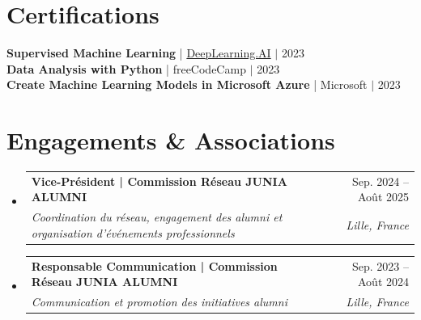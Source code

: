 \documentclass[letterpaper,11pt]{article}
\makeatletter
\newcommand{\resumeSubheading}[4]{
  \vspace{1pt}\item
    \begin{tabular*}{0.97\textwidth}[t]{l@{\extracolsep{\fill}}r}
      {\color{primary}\textbf{#1}} & #2 \\
      \textit{\small#3} & \textit{\small #4} \\
    \end{tabular*}\vspace{-4pt}
}
\newcommand{\resumeSubHeadingListStart}{\begin{itemize}[leftmargin=0.15in, label={}]}
\newcommand{\resumeSubHeadingListEnd}{\end{itemize}}
\makeatother
\begin{document}
\section{Certifications}
\begin{itemize}[leftmargin=0.15in, label={}]
\small{\item{
\textbf{Supervised Machine Learning} | \href{https://www.coursera.org/learn/machine-learning}{DeepLearning.AI} $|$ 2023 \vspace{1.5pt} \\
\textbf{Data Analysis with Python} | freeCodeCamp $|$ 2023 \vspace{1.5pt} \\
\textbf{Create Machine Learning Models in Microsoft Azure} | Microsoft $|$ 2023
}}
\end{itemize}

\section{Engagements \& Associations}
\resumeSubHeadingListStart
  \resumeSubheading
    {Vice-Président | Commission Réseau JUNIA ALUMNI}{Sep. 2024 -- Août 2025}
    {Coordination du réseau, engagement des alumni et organisation d'événements professionnels}{Lille, France}

  \resumeSubheading
    {Responsable Communication | Commission Réseau JUNIA ALUMNI}{Sep. 2023 -- Août 2024}
    {Communication et promotion des initiatives alumni}{Lille, France}
\resumeSubHeadingListEnd
\end{document}
